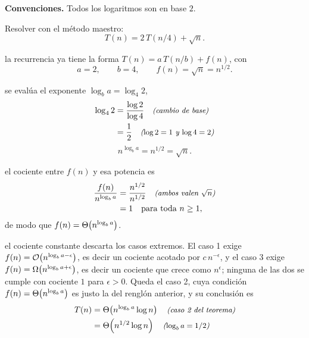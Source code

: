\documentclass[11pt,letterpaper]{article}
\begin{document}

\noindent\textbf{Convenciones.}
Todos los logaritmos son en base $2$.

\noindent Resolver con el método maestro:
\[
  T(n) = 2\,T(n/4) + \sqrt{n}.
\]

 la recurrencia ya tiene la forma
$T(n) = a\,T(n/b) + f(n)$, con
\[
  a = 2, \qquad b = 4, \qquad f(n) = \sqrt{n} = n^{1/2}.
\]

 se evalúa el exponente
$\log_b a = \log_4 2$,
\begin{align*}
  \log_4 2 &= \frac{\log 2}{\log 4} \quad\text{\small\itshape (cambio de base)} \\
           &= \frac{1}{2}
              \quad\text{\small\itshape ($\log 2 = 1$ y $\log 4 = 2$)}
\end{align*}
\[
  n^{\log_b a} = n^{1/2} = \sqrt{n}.
\]

 el cociente entre $f(n)$ y esa potencia es
\begin{align*}
  \frac{f(n)}{n^{\log_b a}} &= \frac{n^{1/2}}{n^{1/2}}
                               \quad\text{\small\itshape (ambos valen $\sqrt{n}$)} \\
                            &= 1 \quad \text{para toda } n \ge 1,
\end{align*}
de modo que $f(n) = \Theta\!\left(n^{\log_b a}\right)$.

 el cociente constante descarta los casos
extremos. El caso 1 exige $f(n) = \mathcal{O}\!\left(n^{\log_b a - \epsilon}\right)$, es
decir un cociente acotado por $c\,n^{-\epsilon}$, y el caso 3 exige
$f(n) = \Omega\!\left(n^{\log_b a + \epsilon}\right)$, es decir un cociente que crece
como $n^{\epsilon}$; ninguna de las dos se cumple con cociente $1$
para $\epsilon > 0$. Queda el caso 2, cuya condición
$f(n) = \Theta\!\left(n^{\log_b a}\right)$ es justo la del renglón anterior, y su
conclusión es
\begin{align*}
  T(n) &= \Theta\!\left(n^{\log_b a} \log n\right) \quad\text{\small\itshape (caso 2 del teorema)} \\
       &= \Theta\!\left(n^{1/2} \log n\right)      \quad\text{\small\itshape ($\log_b a = 1/2$)}
\end{align*}

\end{document}

